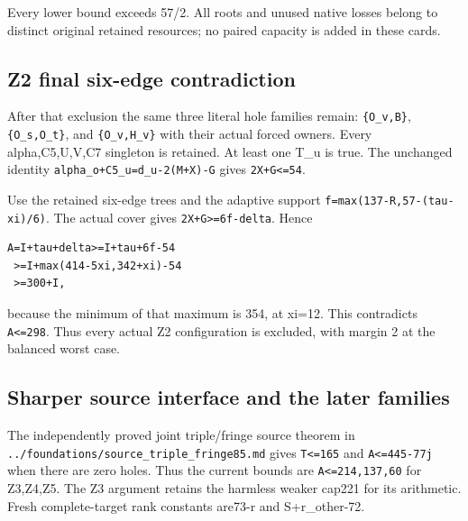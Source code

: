\documentclass[10pt,a4paper]{article}
\theoremstyle{definition}
\begin{document}
Every lower bound exceeds 57/2. All roots and unused native losses
belong to distinct original retained resources; no paired capacity is
added in these cards.

\hypertarget{z2-final-six-edge-contradiction}{%
\subsection{Z2 final six-edge
contradiction}\label{z2-final-six-edge-contradiction}}

After that exclusion the same three literal hole families remain:
\texttt{\{O\_\allowbreak{}\allowbreak{}v,\allowbreak{}B\}},\allowbreak{}
\texttt{\{O\_\allowbreak{}\allowbreak{}s,\allowbreak{}O\_\allowbreak{}\allowbreak{}t\}},\allowbreak{} and
\texttt{\{O\_\allowbreak{}\allowbreak{}v,\allowbreak{}H\_\allowbreak{}\allowbreak{}v\}} with their actual forced owners.
Every alpha,\allowbreak{}C5,\allowbreak{}U,\allowbreak{}V,\allowbreak{}C7 singleton is retained. At least one T\_\allowbreak{}u is true.
The unchanged identity
\texttt{alpha\_\allowbreak{}\allowbreak{}o+\allowbreak{}C5\_\allowbreak{}\allowbreak{}u=\allowbreak{}d\_\allowbreak{}\allowbreak{}u-2(M+\allowbreak{}X)-G} gives
\texttt{2X+\allowbreak{}G<=\allowbreak{}54}.

Use the retained six-edge trees and the adaptive support
\texttt{f=\allowbreak{}max(137-R,\allowbreak{}57-(tau-xi)/\allowbreak{}6)}. The actual cover
gives \texttt{2X+\allowbreak{}G>=\allowbreak{}6f-delta}. Hence

\begin{lstlisting}
A=I+tau+delta>=I+tau+6f-54
 >=I+max(414-5xi,342+xi)-54
 >=300+I,
\end{lstlisting}

because the minimum of that maximum is 354,\allowbreak{} at xi=\allowbreak{}12. This contradicts
\texttt{A<=\allowbreak{}298}. Thus every actual Z2 configuration is
excluded,\allowbreak{} with margin 2 at the balanced worst case.

\hypertarget{sharper-source-interface-and-the-later-families}{%
\subsection{Sharper source interface and the later
families}\label{sharper-source-interface-and-the-later-families}}

The independently proved joint triple/fringe source theorem in
\texttt{../\allowbreak{}foundations/\allowbreak{}source\_\allowbreak{}\allowbreak{}triple\_\allowbreak{}\allowbreak{}fringe85.md}
gives \texttt{T<=\allowbreak{}165} and
\texttt{A<=\allowbreak{}445-77j} when there are zero holes. Thus the
current bounds are \texttt{A<=\allowbreak{}214,\allowbreak{}137,\allowbreak{}60} for Z3,\allowbreak{}Z4,\allowbreak{}Z5.
The Z3 argument retains the harmless weaker cap221 for its arithmetic.
Fresh complete-target rank constants are73-r and S+\allowbreak{}r\_\allowbreak{}other-72.
\end{document}
